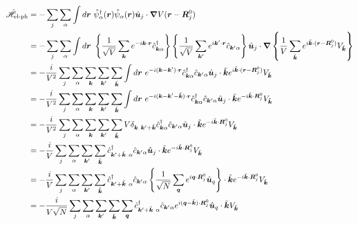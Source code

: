 \documentclass[dvipdfmx, 11pt, a4paper]{jsarticle}
\theoremstyle{definition}
\numberwithin{equation}{section}
\begin{document}
    \begin{derivationBox}
        \begin{align}
            \hat{\mathscr{H}}_{\text{el-ph}} &= -\sum_j\sum_\alpha \int d\bm{r}\ \hat{\psi}^\dagger_\alpha(\bm{r})  \hat{\psi}_\alpha(\bm{r}) \hat{\bm{u}}_j \cdot \bm{\nabla}V(\bm{r}-\bm{R}_j^0) \notag \\
            &= -\sum_j\sum_\alpha \int d\bm{r}\ \left\{ \frac{1}{\sqrt{V}}\sum_{\bm{k}}e^{-i\bm{k}\cdot \bm{r}} \hat{c}^\dagger_{\bm{k}\alpha} \right\}  \left\{ \frac{1}{\sqrt{V}}\sum_{\bm{k}'}e^{i\bm{k}'\cdot \bm{r}} \hat{c}_{\bm{k}'\alpha} \right\}   \hat{\bm{u}}_j \cdot \bm{\nabla}\left\{\frac{1}{V}\sum_{\tilde{\bm{k}}} e^{i\tilde{\bm{k}}\cdot (\bm{r}-\bm{R}_j^0)}V_{\tilde{\bm{k}}}  \right\} \notag \\
            &= -\frac{i}{V^2}\sum_j\sum_\alpha \sum_{\bm{k}} \sum_{\bm{k}'}\sum_{\tilde{\bm{k}}}\int d\bm{r}\  e^{-i(\bm{k}-\bm{k}')\cdot \bm{r}} \hat{c}^\dagger_{\bm{k}\alpha}   \hat{c}_{\bm{k}'\alpha}  \hat{\bm{u}}_j \cdot \tilde{\bm{k}} e^{i\tilde{\bm{k}}\cdot (\bm{r}-\bm{R}_j^0)}V_{\tilde{\bm{k}}}  \notag \\
            &= -\frac{i}{V^2}\sum_j\sum_\alpha \sum_{\bm{k}} \sum_{\bm{k}'}\sum_{\tilde{\bm{k}}}\int d\bm{r}\  e^{-i(\bm{k}-\bm{k}'-\tilde{\bm{k}})\cdot \bm{r}} \hat{c}^\dagger_{\bm{k}\alpha}   \hat{c}_{\bm{k}'\alpha}   \hat{\bm{u}}_j \cdot \tilde{\bm{k}} e^{-i\tilde{\bm{k}}\cdot \bm{R}_j^0}V_{\tilde{\bm{k}}}  \notag \\
            &= -\frac{i}{V^2}\sum_j\sum_\alpha \sum_{\bm{k}} \sum_{\bm{k}'}\sum_{\tilde{\bm{k}}}V \delta_{\bm{k}\ \bm{k}'+\tilde{\bm{k}}} \hat{c}^\dagger_{\bm{k}\alpha}   \hat{c}_{\bm{k}'\alpha}   \hat{\bm{u}}_j \cdot \tilde{\bm{k}} e^{-i\tilde{\bm{k}}\cdot \bm{R}_j^0}V_{\tilde{\bm{k}}}  \notag \\
            &= -\frac{i}{V}\sum_j\sum_\alpha  \sum_{\bm{k}'}\sum_{\tilde{\bm{k}}} \hat{c}^\dagger_{\bm{k}'+\tilde{\bm{k}}\ \alpha}   \hat{c}_{\bm{k}'\alpha}   \hat{\bm{u}}_j \cdot \tilde{\bm{k}} e^{-i\tilde{\bm{k}}\cdot \bm{R}_j^0}V_{\tilde{\bm{k}}}  \notag \\
            &= -\frac{i}{V}\sum_j\sum_\alpha  \sum_{\bm{k}'}\sum_{\tilde{\bm{k}}} \hat{c}^\dagger_{\bm{k}'+\tilde{\bm{k}}\ \alpha}   \hat{c}_{\bm{k}'\alpha} \left\{ \frac{1}{\sqrt{N}}\sum_{\bm{q}} e^{i\bm{q}\cdot \bm{R}_j^0}\hat{\bm{u}}_q \right\} \cdot \tilde{\bm{k}} e^{-i\tilde{\bm{k}}\cdot \bm{R}_j^0}V_{\tilde{\bm{k}}}  \notag \\
            &= -\frac{i}{V\sqrt{N}}\sum_j\sum_\alpha  \sum_{\bm{k}'}\sum_{\tilde{\bm{k}}} \sum_{\bm{q}}\hat{c}^\dagger_{\bm{k}'+\tilde{\bm{k}}\ \alpha}   \hat{c}_{\bm{k}'\alpha}   e^{i(\bm{q}-\tilde{\bm{k}})\cdot\bm{R}_j^0}\hat{\bm{u}}_q \cdot \tilde{\bm{k}} V_{\tilde{\bm{k}}}  \notag \\

\end{align}
\end{derivationBox}
\end{document}
